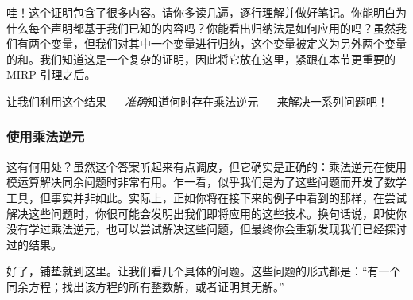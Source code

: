 哇！这个证明包含了很多内容。请你多读几遍，逐行理解并做好笔记。你能明白为什么每个声明都基于我们已知的内容吗？你能看出归纳法是如何应用的吗？虽然我们有两个变量，但我们对其中一个变量进行归纳，这个变量被定义为另外两个变量的和。我们知道这是一个复杂的证明，因此将它放在这里，紧跟在本节更重要的 MIRP 引理之后。

让我们利用这个结果 --- \emph{准确}知道何时存在乘法逆元 --- 来解决一系列问题吧！

\subsubsection*{使用乘法逆元}

这有何用处？虽然这个答案听起来有点调皮，但它确实是正确的：乘法逆元在使用模运算解决同余问题时非常有用。乍一看，似乎我们是为了这些问题而开发了数学工具，但事实并非如此。实际上，正如你将在接下来的例子中看到的那样，在尝试解决这些问题时，你很可能会发明出我们即将应用的这些技术。换句话说，即使你没有学过乘法逆元，也可以尝试解决这些问题，但最终你会重新发现我们已经探讨过的结果。

好了，铺垫就到这里。让我们看几个具体的问题。这些问题的形式都是：``有一个同余方程；找出该方程的所有整数解，或者证明其无解。''\\

